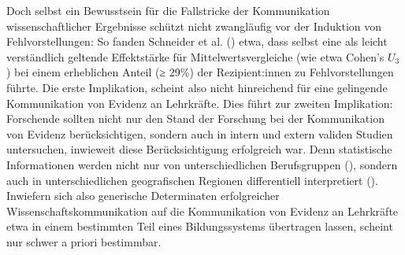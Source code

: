 \documentclass[
  jou,
  floatsintext,
  longtable,
  nolmodern,
  notxfonts,
  notimes,
  colorlinks=true,linkcolor=blue,citecolor=blue,urlcolor=blue]{apa7}
\begin{document}
Doch selbst ein Bewusstsein für die Fallstricke der Kommunikation
wissenschaftlicher Ergebnisse schützt nicht zwangläufig vor der
Induktion von Fehlvorstellungen: So fanden Schneider et al.
() etwa, dass selbst eine als leicht
verständlich geltende Effektstärke für Mittelwertsvergleiche (wie etwa
Cohen's \(U_3\)) bei einem erheblichen Anteil (≥ 29\%) der
Rezipient:innen zu Fehlvorstellungen führte. Die erste Implikation,
scheint also nicht hinreichend für eine gelingende Kommunikation von
Evidenz an Lehrkräfte. Dies führt zur zweiten Implikation: Forschende
sollten nicht nur den Stand der Forschung bei der Kommunikation von
Evidenz berücksichtigen, sondern auch in intern und extern validen
Studien untersuchen, inwieweit diese Berücksichtigung erfolgreich war.
Denn statistische Informationen werden nicht nur von unterschiedlichen
Berufsgruppen (),
sondern auch in unterschiedlichen geografischen Regionen differentiell
interpretiert ().
Inwiefern sich also generische Determinaten erfolgreicher
Wissenschaftskommunikation auf die Kommunikation von Evidenz an
Lehrkräfte etwa in einem bestimmten Teil eines Bildungssystems
übertragen lassen, scheint nur schwer a priori bestimmbar.
\end{document}
